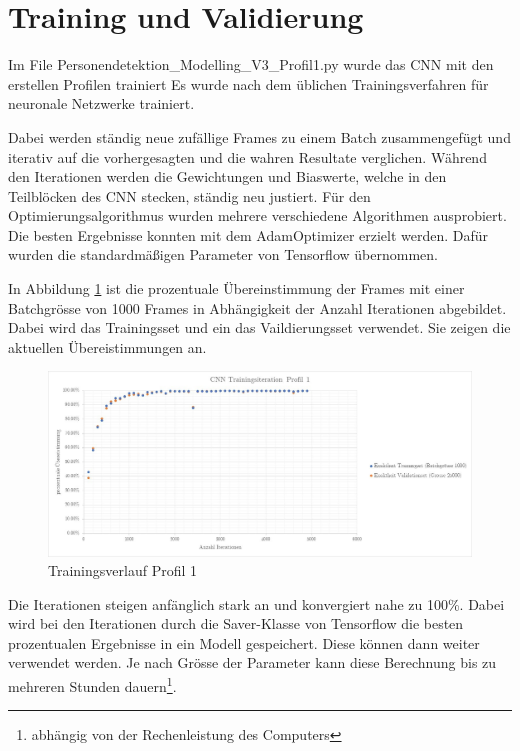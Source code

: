 \newpage
\section{Training und Validierung}
\label{TrainingValidierung}

  Im File Personendetektion\_Modelling\_V3\_Profil1.py wurde das \ac{CNN} mit den erstellen Profilen trainiert Es wurde nach dem üblichen Trainingsverfahren für neuronale Netzwerke trainiert.

Dabei werden ständig neue zufällige Frames zu einem Batch zusammengefügt und iterativ  auf die vorhergesagten und die wahren Resultate verglichen. Während den Iterationen werden die Gewichtungen und Biaswerte, welche in den Teilblöcken des CNN stecken, ständig neu justiert. 
Für den Optimierungsalgorithmus wurden mehrere verschiedene Algorithmen ausprobiert. Die besten Ergebnisse konnten mit dem AdamOptimizer erzielt werden. Dafür wurden die standardmäßigen Parameter von Tensorflow übernommen.

In Abbildung \ref{fig:traininsverlauf} ist die prozentuale Übereinstimmung der Frames mit einer Batchgrösse von 1000 Frames in Abhängigkeit der Anzahl Iterationen abgebildet. Dabei wird das Trainingsset und ein das Vaildierungsset verwendet. Sie zeigen die aktuellen Übereistimmungen an. 

\begin{figure}[H]
	\centering
	\caption[Trainingsverlauf Profil 1]{Trainingsverlauf Profil 1}
	\label{fig:traininsverlauf}
	\includegraphics[width=1.0\linewidth]{fig/Traininsverlauf}
\end{figure}

Die Iterationen steigen anfänglich stark an und konvergiert nahe zu 100\%. Dabei wird bei den Iterationen durch die  Saver-Klasse von Tensorflow die besten prozentualen Ergebnisse in ein Modell gespeichert. Diese können dann weiter verwendet werden. Je nach Grösse der Parameter kann diese Berechnung bis zu mehreren Stunden dauern\footnote{abhängig von der Rechenleistung des Computers}. 


